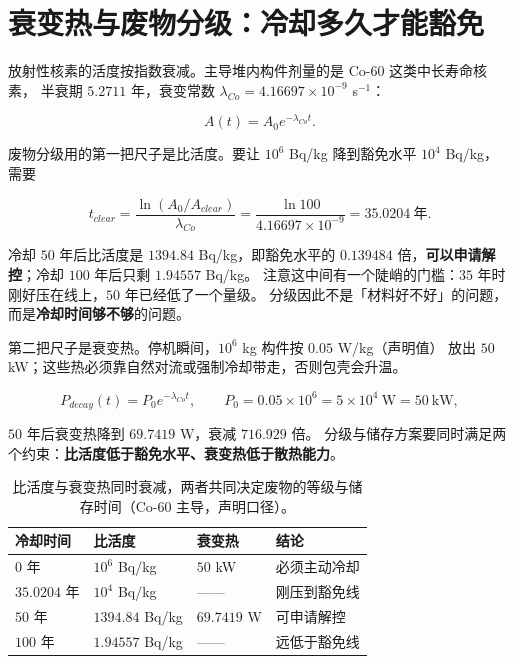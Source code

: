 \section{衰变热与废物分级：冷却多久才能豁免}
\label{sec:app-ak-waste}

放射性核素的活度按指数衰减。主导堆内构件剂量的是 Co-60 这类中长寿命核素，
半衰期 $5.2711$ 年，衰变常数 $\lambda_{Co}=4.16697\times10^{-9}$ s$^{-1}$：

\begin{equation}
A(t)=A_0e^{-\lambda_{Co}t}.
\label{eq:app-ak-decay}
\end{equation}

废物分级用的第一把尺子是比活度。要让 $10^{6}$ Bq/kg 降到豁免水平
$10^{4}$ Bq/kg，需要

\begin{equation}
t_{clear}=\frac{\ln(A_0/A_{clear})}{\lambda_{Co}}
=\frac{\ln 100}{4.16697\times10^{-9}}=35.0204\ \text{年}.
\label{eq:app-ak-clear}
\end{equation}

冷却 $50$ 年后比活度是 $1394.84$ Bq/kg，即豁免水平的 $0.139484$ 倍，\textbf{可以申请解控}；冷却 $100$ 年后只剩 $1.94557$ Bq/kg。
注意这中间有一个陡峭的门槛：$35$ 年时刚好压在线上，$50$ 年已经低了一个量级。
分级因此不是「材料好不好」的问题，而是\textbf{冷却时间够不够}的问题。

第二把尺子是衰变热。停机瞬间，$10^{6}$ kg 构件按 $0.05$ W/kg（声明值）
放出 $50$ kW；这些热必须靠自然对流或强制冷却带走，否则包壳会升温。

\begin{equation}
P_{decay}(t)=P_0e^{-\lambda_{Co}t},\qquad
P_0=0.05\times10^{6}=5\times10^{4}\ \mathrm{W}=50\ \mathrm{kW},
\label{eq:app-ak-heat}
\end{equation}

$50$ 年后衰变热降到 $69.7419$ W，衰减 $716.929$ 倍。
分级与储存方案要同时满足两个约束：\textbf{比活度低于豁免水平、衰变热低于散热能力}。

\begin{table}[htbp]
\centering
\small
\caption{比活度与衰变热同时衰减，两者共同决定废物的等级与储存时间（Co-60 主导，声明口径）。}
\label{tab:app-ak-waste}
\begin{tabular}{p{2.6cm}p{3.4cm}p{3.0cm}p{4.4cm}}
\toprule
冷却时间 & 比活度 & 衰变热 & 结论 \\
\midrule
$0$ 年 & $10^{6}$ Bq/kg & $50$ kW & 必须主动冷却 \\
$35.0204$ 年 & $10^{4}$ Bq/kg & —— & 刚压到豁免线 \\
$50$ 年 & $1394.84$ Bq/kg & $69.7419$ W & 可申请解控 \\
$100$ 年 & $1.94557$ Bq/kg & —— & 远低于豁免线 \\
\bottomrule
\end{tabular}

\end{table}


